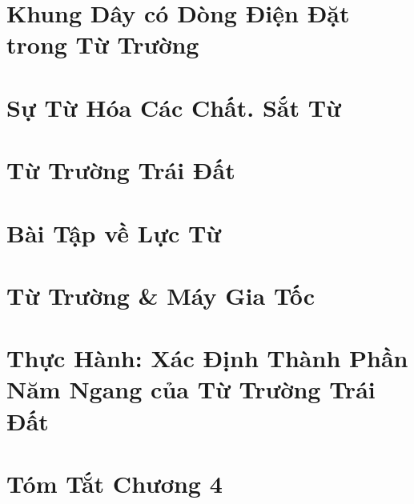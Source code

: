 \documentclass[oneside]{book}
\numberwithin{equation}{section}
\begin{document}

\section{Khung Dây có Dòng Điện Đặt trong Từ Trường}


\section{Sự Từ Hóa Các Chất. Sắt Từ}


\section{Từ Trường Trái Đất}


\section{Bài Tập về Lực Từ}


\section{Từ Trường \& Máy Gia Tốc}


\section{Thực Hành: Xác Định Thành Phần Năm Ngang của Từ Trường Trái Đất}


\section{Tóm Tắt Chương 4}

\end{document}

